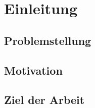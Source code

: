 \newpage
\section{Einleitung}
\subsection{Problemstellung}
\subsection{Motivation}
\subsection{Ziel der Arbeit}